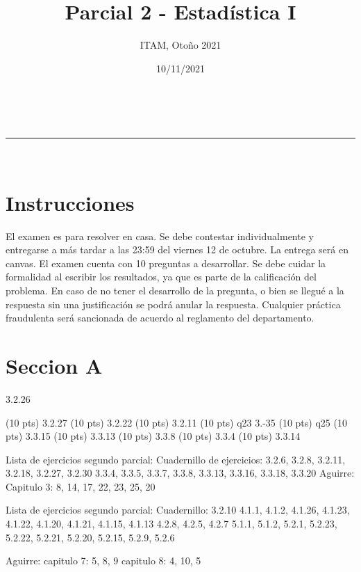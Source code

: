 \documentclass[addpoints]{exam}
\makeatletter
\newcommand{\linia}{\rule{\linewidth}{0.5pt}}
\theoremstyle{mytheor}
\renewcommand{\maketitle}{
    \begin{center}
    \vspace{2ex}
    {\huge \textsc{\@title}}
    \vspace{1ex}
    \\
    \linia\\
    \@author \hfill \@date
    \vspace{4ex}
    \end{center}
  }
\makeatother
\begin{document}
  
  \title{Parcial 2 - Estadística I}
  
  \author{ITAM, Otoño 2021}
  
  \date{10/11/2021}
  
  \maketitle
  
  \section*{Instrucciones}
  
El examen es para resolver en casa. Se debe contestar individualmente y entregarse a más tardar a las 23:59 del viernes 12 de octubre. La entrega será en canvas. El examen cuenta con 10 preguntas a desarrollar. Se debe cuidar la formalidad al escribir los resultados, ya que es parte de la calificación del problema. En caso de no tener el desarrollo de la pregunta, o bien se llegué a la respuesta sin una justificación se podrá anular la respuesta. Cualquier práctica fraudulenta será sancionada de acuerdo al reglamento del departamento. 

\vspace{10pt}
  

  
  \section*{Seccion A}
  
  \begin{questions} 3.2.26
  
  \question (10 pts) 3.2.27
  \question (10 pts) 3.2.22
  \question (10 pts) 3.2.11
  \question (10 pts) q23 3.-35
  \question (10 pts) q25
  \question (10 pts) 3.3.15
  \question (10 pts) 3.3.13
  \question (10 pts) 3.3.8
  \question (10 pts) 3.3.4
  \question (10 pts) 3.3.14
  
  
  Lista de ejercicios segundo parcial:
  Cuadernillo de ejercicios:
  3.2.6, 3.2.8, 3.2.11, 3.2.18, 3.2.27, 3.2.30
  3.3.4, 3.3.5, 3.3.7, 3.3.8, 3.3.13, 3.3.16, 3.3.18, 3.3.20
  Aguirre:
  Capitulo 3: 8, 14, 17, 22, 23, 25, 20
  
  Lista de ejercicios segundo parcial:
  Cuadernillo:
  3.2.10
  4.1.1, 4.1.2, 4.1.26, 4.1.23, 4.1.22, 4.1.20, 4.1.21, 4.1.15, 4.1.13
  4.2.8, 4.2.5, 4.2.7
  5.1.1, 5.1.2,
  5.2.1, 5.2.23, 5.2.22, 5.2.21, 5.2.20, 5.2.15, 5.2.9, 5.2.6
  
  Aguirre:
  capitulo 7: 5, 8, 9
  capitulo 8: 4, 10, 5
  
  
  
  
  
  
 
\end{questions} 
\end{document}
